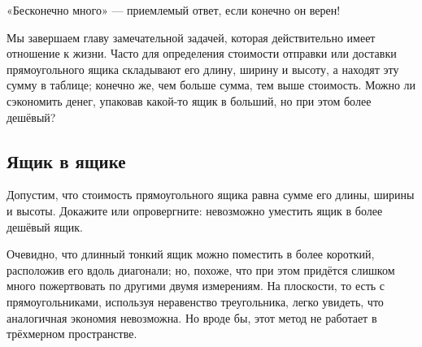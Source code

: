  «Бесконечно много» --- приемлемый ответ, если конечно он верен!

\medskip

Мы завершаем главу замечательной задачей, которая действительно имеет отношение к жизни.
Часто для определения стоимости отправки или доставки прямоугольного ящика складывают его длину, ширину и высоту,
а находят эту сумму в таблице;
конечно же, чем больше сумма, тем выше стоимость.
Можно ли сэкономить денег, упаковав какой-то ящик в больший, но при этом более дешёвый?

\subsection*{Ящик в ящике}

Допустим, что стоимость прямоугольного ящика равна сумме его длины, ширины и высоты.
Докажите или опровергните: невозможно уместить ящик в более дешёвый ящик.

Очевидно, что длинный тонкий ящик можно поместить в более короткий, расположив его вдоль диагонали;
но, похоже, что при этом придётся слишком много пожертвовать по другими двумя измерениям.
На плоскости, то есть с прямоугольниками, используя неравенство треугольника, легко увидеть, что аналогичная экономия невозможна.
Но вроде бы, этот метод не работает в трёхмерном пространстве.
